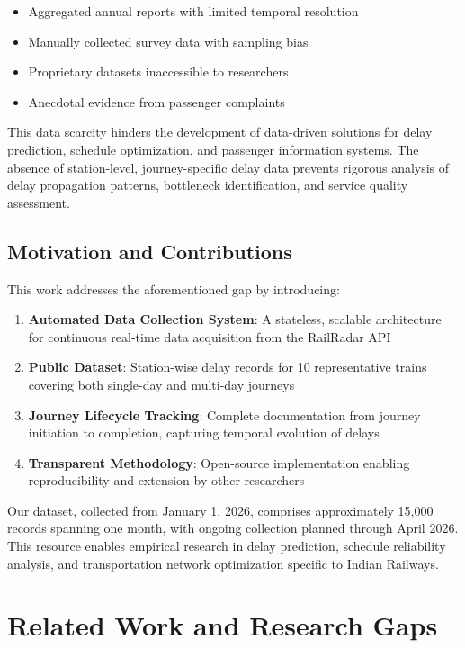 \documentclass[11pt,a4paper]{article}
\begin{document}
\begin{itemize}
    \item Aggregated annual reports with limited temporal resolution
    \item Manually collected survey data with sampling bias
    \item Proprietary datasets inaccessible to researchers
    \item Anecdotal evidence from passenger complaints
\end{itemize}

This data scarcity hinders the development of data-driven solutions for delay prediction, schedule optimization, and passenger information systems. The absence of station-level, journey-specific delay data prevents rigorous analysis of delay propagation patterns, bottleneck identification, and service quality assessment.

\subsection{Motivation and Contributions}

This work addresses the aforementioned gap by introducing:

\begin{enumerate}
    \item \textbf{Automated Data Collection System}: A stateless, scalable architecture for continuous real-time data acquisition from the RailRadar API
    \item \textbf{Public Dataset}: Station-wise delay records for 10 representative trains covering both single-day and multi-day journeys
    \item \textbf{Journey Lifecycle Tracking}: Complete documentation from journey initiation to completion, capturing temporal evolution of delays
    \item \textbf{Transparent Methodology}: Open-source implementation enabling reproducibility and extension by other researchers
\end{enumerate}

Our dataset, collected from January 1, 2026, comprises approximately 15,000 records spanning one month, with ongoing collection planned through April 2026. This resource enables empirical research in delay prediction, schedule reliability analysis, and transportation network optimization specific to Indian Railways.

\section{Related Work and Research Gaps}
\end{document}
